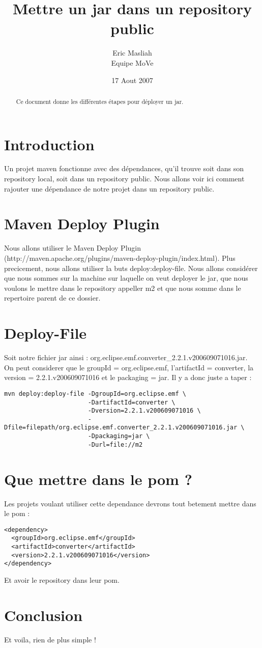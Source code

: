 \documentclass[a4paper,10pt]{article}
\title{Mettre un jar dans un repository public}
\author{Eric Masliah\\
Equipe MoVe}
\date{17 Aout 2007}
\begin{document}
\maketitle

\begin{abstract}
Ce document donne les différentes étapes pour déployer un jar.
\end{abstract}

\section{Introduction}
Un projet maven fonctionne avec des dépendances, qu'il trouve soit dans son repository local, soit dans un repository public. Nous allons voir ici comment rajouter une dépendance de notre projet dans un repository public.

\section{Maven Deploy Plugin}
Nous allons utiliser le Maven Deploy Plugin\\ (http://maven.apache.org/plugins/maven-deploy-plugin/index.html). Plus precicement, nous allons utiliser la buts deploy:deploy-file. Nous allons considérer que nous sommes sur la machine sur laquelle on veut deployer le jar, que nous voulons le mettre dans le repository appeller m2 et que nous somme dans le repertoire parent de ce dossier.

\section{Deploy-File}
Soit notre fichier jar ainsi : org.eclipse.emf.converter\_2.2.1.v200609071016.jar.\\
On peut considerer que le groupId = org.eclipse.emf, l'artifactId = converter, la version = 2.2.1.v200609071016 et le packaging = jar. Il y a donc juste a taper : \\
\begin{verbatim}
mvn deploy:deploy-file -DgroupId=org.eclipse.emf \
                       -DartifactId=converter \
                       -Dversion=2.2.1.v200609071016 \
                       -Dfile=filepath/org.eclipse.emf.converter_2.2.1.v200609071016.jar \
                       -Dpackaging=jar \
                       -Durl=file://m2
\end{verbatim}

\section{Que mettre dans le pom ?}
Les projets voulant utiliser cette dependance devrons tout betement mettre dans le pom :
\begin{verbatim}
<dependency>
  <groupId>org.eclipse.emf</groupId>
  <artifactId>converter</artifactId>
  <version>2.2.1.v200609071016</version>
</dependency>
\end{verbatim}
Et avoir le repository dans leur pom.

\section{Conclusion}
Et voila, rien de plus simple !
\end{document}

